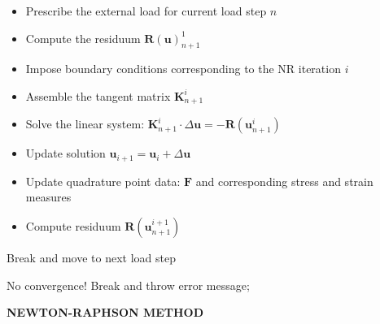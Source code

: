 \begin{algorithm}[H]
\BlankLine
{}
{
	\begin{itemize}
	\item Prescribe the external load for current load step $n$\;
	\item Compute the residuum $\mathbf{R}(\mathbf{u})^1_{n+1}$\;
	\end{itemize}

	{
		{
		\begin{itemize}
		\item Impose boundary conditions corresponding to the NR iteration $i$\;
		\item Assemble the tangent matrix $\mathbf{K}^{i}_{n+1}$\;
		\item Solve the linear system: $\mathbf{K}^{i}_{n+1} \cdot \Delta\mathbf{u} = -\mathbf{R}(\mathbf{u}^i_{n+1})$\;
		\item Update solution $\mathbf{u}_{i+1} = \mathbf{u}_i + \Delta\mathbf{u}$\;
		\item Update quadrature point data: $\mathbf{F}$ and corresponding stress and strain measures\;
		\item Compute residuum $\mathbf{R}(\mathbf{u}^{i+1}_{n+1})$\;
		\end{itemize}
		}
		{Break and move to next load step\;}			
	}
	{No convergence! Break and throw error message;}
}
\caption{\textbf{NEWTON-RAPHSON METHOD}}
\label{alg:1}
\end{algorithm} \par

